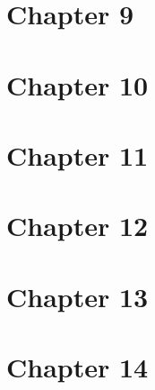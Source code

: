 \documentclass{wileySix}
\begin{document}
\chapter{Chapter 9}
%
%
%
%
%
%
%
%
%
%
%
%
%
%
%
%
%
%
%


\chapter{Chapter 10}
%
%
%
%
%
%
%
%
%
%
%
%
%
%
%
%
%
%

\chapter{Chapter 11}


\chapter{Chapter 12}


\chapter{Chapter 13}


\chapter{Chapter 14}

\end{document}
